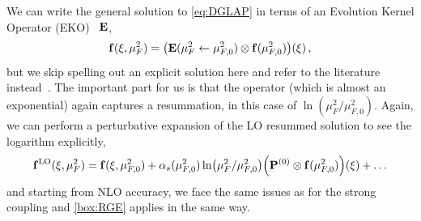 We can write the general solution to \cref{eq:DGLAP} in terms of an Evolution Kernel Operator (EKO)~\cite{Candido:2022tld} $\vb E$,
\begin{equation}
    \vb f (\xi,\mu_F^2) = \qty(\vb E(\mu_F^2 \leftarrow \mu_{F,0}^2) \otimes \vb f(\mu_{F,0}^2))(\xi)\,, \label{eq:EKO}
\end{equation}
but we skip spelling out an explicit solution here and refer to the literature instead~\cite{Candido:2022tld}.
The important part for us is that the operator (which is almost an exponential) again captures a resummation, in this case of $\ln(\mu_F^2/\mu_{F,0}^2)$.
Again, we can perform a perturbative expansion of the LO resummed solution to see the logarithm explicitly,
\begin{equation}
    \vb f^\text{LO}(\xi,\mu_F^2) = \vb f(\xi,\mu_{F,0}^2) + \alpha_s(\mu_{F,0}^2) \ln(\mu_F^2/\mu_{F,0}^2) \qty(\vb P^{(0)} \otimes \vb f(\mu_{F,0}^2))(\xi) + \ldots \label{eq:LOPDFexp}
\end{equation}
and starting from NLO accuracy, we face the same issues as for the strong coupling and \cref{box:RGE} applies in the same way.
